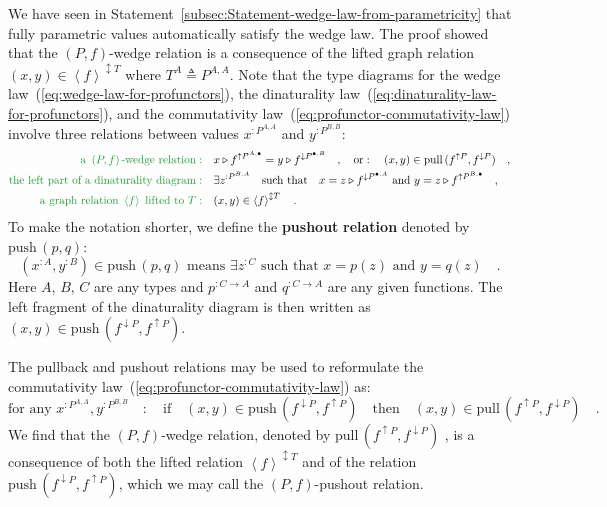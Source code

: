 We have seen in Statement~\ref{subsec:Statement-wedge-law-from-parametricity}
that fully parametric values automatically satisfy the wedge law.
The proof showed that the $\left(P,f\right)$-wedge relation is a
consequence of the lifted graph relation $(x,y)\in\left<f\right>^{\updownarrow T}$
where $T^{A}\triangleq P^{A,A}$. Note that the type diagrams for
the wedge law~(\ref{eq:wedge-law-for-profunctors}), the dinaturality
law~(\ref{eq:dinaturality-law-for-profunctors}), and the commutativity
law~(\ref{eq:profunctor-commutativity-law}) involve three relations
between values $x^{:P^{A,A}}$ and $y^{:P^{B,B}}$:
\begin{align*}
{\color{greenunder}\text{a }\left(P,f\right)\text{-wedge relation}:}\quad & x\triangleright f^{\uparrow P^{A,\bullet}}=y\triangleright f^{\downarrow P^{\bullet,B}}\quad,\quad\text{or}:\quad(x,y)\in\text{pull}\,(f^{\uparrow P},f^{\downarrow P})\quad,\\
{\color{greenunder}\text{the left part of a dinaturality diagram}:}\quad & \exists z^{:P^{B,A}}\quad\text{such that}\quad x=z\triangleright f^{\downarrow P^{\bullet,A}}\text{ and }y=z\triangleright f^{\uparrow P^{B,\bullet}}\quad,\\
{\color{greenunder}\text{a graph relation }\left<f\right>\text{ lifted to }T:}\quad & (x,y)\in\left<f\right>^{\updownarrow T}\quad.
\end{align*}
To make the notation shorter, we define the \textbf{pushout} \textbf{relation}
denoted by $\text{push}\,(p,q)$:
\[
(x^{:A},y^{:B})\in\text{push}\,(p,q)\text{ means }\exists z^{:C}\text{ such that }x=p(z)\text{ and }y=q(z)\quad.
\]
Here $A$, $B$, $C$ are any types and $p^{:C\rightarrow A}$ and
$q^{:C\rightarrow A}$ are any given functions. The left fragment
of the dinaturality diagram is then written as $(x,y)\in\text{push}\,(f^{\downarrow P},f^{\uparrow P})$.

The pullback and pushout relations may be used to reformulate the
commutativity law~(\ref{eq:profunctor-commutativity-law}) as: 
\[
\text{for any }x^{:P^{A,A}},y^{:P^{B,B}}\quad:\quad\text{if}\quad(x,y)\in\text{push}\,(f^{\downarrow P},f^{\uparrow P})\quad\text{then}\quad(x,y)\in\text{pull}\,(f^{\uparrow P},f^{\downarrow P})\quad.
\]
We find that the $\left(P,f\right)$-wedge relation, denoted by $\text{pull}\,(f^{\uparrow P},f^{\downarrow P})$
, is a consequence of both the lifted relation $\left<f\right>^{\updownarrow T}$
and of the relation $\text{push}\,(f^{\downarrow P},f^{\uparrow P})$,
which we may call the $\left(P,f\right)$-pushout relation.

